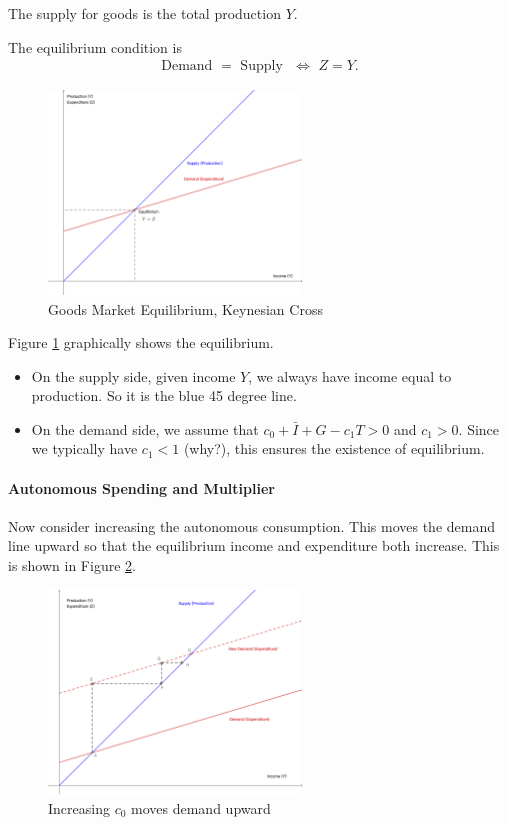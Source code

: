 \documentclass[12pt]{article}
\begin{document}
The supply for goods is the total production $Y$. 

The equilibrium condition is
\begin{align}\label{eq:eqm_cond}
    \text{Demand } = \text{ Supply }\,\, \iff \,\, Z = Y.
\end{align}

\begin{figure}[htp]
    \centering
    \includegraphics[width=0.6\textwidth]{keynesian_cross_0.png}
    \caption{Goods Market Equilibrium, Keynesian Cross}
    \label{fig:key_cross_v1}
\end{figure}

Figure \ref{fig:key_cross_v1} graphically shows the equilibrium. 
\begin{itemize}
    \item On the supply side, given income $Y$, we always have income equal to production. So it is the blue 45 degree line.
    \item On the demand side, we assume that $c_0 + \bar{I} + G - c_1T > 0$ and $c_1 > 0$. Since we typically have $c_1<1$ (why?), this ensures the existence of equilibrium.
\end{itemize}

\paragraph{Autonomous Spending and Multiplier}
Now consider increasing the autonomous consumption. This moves the demand line upward so that the equilibrium income and expenditure both increase. This is shown in Figure \ref{fig:key_cross_v2}.

\begin{figure}[htp]
    \centering
    \includegraphics[width=0.6\textwidth]{keynesian_cross_c0change.png}
    \caption{Increasing $c_0$ moves demand upward}
    \label{fig:key_cross_v2}
\end{figure}
\end{document}
